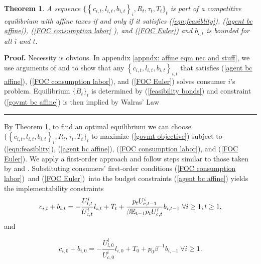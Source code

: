 \documentclass[thmsb,11pt]{article}
\newtheorem{theorem}{Theorem}
\newenvironment{proof}[1][Proof]{\noindent \textbf{#1.} }{\  \rule{0.5em}{0.5em}}
\begin{document}
\begin{theorem}
\label{prop: affine eqm nec and suff}A sequence $\{ \left \{
c_{i,t},l_{i,t},b_{i,t}\right \} _{i},R_{t},\tau _{t},T_{t}\}_t$ is part of
a competitive equilibrium with affine taxes if and only if it satisfies (\ref{eqn:feasiblity}), (\ref{agent bc affine}), (\ref{FOC consumption labor}%
), and (\ref{FOC Euler}) and $b_{i,t}$ is bounded for all $i$ and $t.$
\end{theorem}
\begin{proof}
Necessity is obvious. In  appendix   \ref{appndx: affine eqm nec and stuff}, we use arguments of \cite{Magill1994} and \cite{Constantinides1996} to show that any $\left \{
c_{i,t},l_{i,t},b_{i,t}\right \} _{i,t}$ that satisfies (\ref{agent bc
affine}), (\ref{FOC consumption labor}), and (\ref{FOC Euler}) solves consumer $i$'s  problem. Equilibrium $\{B_{t}\}_t$ is determined by
(\ref{feasibility bonds}) and constraint (\ref{govmt bc affine}) is then
implied by Walras' Law
\end{proof}

By Theorem  \ref{prop: affine eqm nec and suff}, to find an optimal equilibrium
we can choose $\{ \left \{ c_{i,t},l_{i,t},b_{i,t}\right \} _{i},R_{t},\tau
_{t},T_{t}\}_{t}$ to maximize (\ref{govmt objective}) subject to (\ref{eqn:feasiblity}), (\ref{agent bc affine}), (\ref{FOC consumption labor}), and (\ref{FOC Euler}).
We  apply a first-order approach and follow steps similar to those taken by \cite{LucasJr.1983} and \citet{Aiyagari2002}.
 Substituting consumers' first-order
conditions (\ref{FOC consumption labor})\ and (\ref{FOC Euler})\ into the
budget constraints (\ref{agent bc affine}) yields the implementability constraints %
\begin{equation}
c_{i,t}+b_{i,t}=-\frac{U_{l,t}^{i}}{U_{c,t}^{i}}l_{i,t}+T_{t}+\frac{%
p_tU_{c,t-1}^{i}}{\beta \mathbb{E}_{t-1}p_tU_{c,t}^{i}}b_{i,t-1}\ \forall i \geq 1 ,t \geq 1,  \label{affine implementability a}
\end{equation}
and %

\begin{equation}
\label{affine implementability a t=0}
c_{i,0}+b_{i,0}=-\frac{U_{l,0}^{i}}{U_{c,0}^{i}}l_{i,0}+T_{0}+
p_0 \beta^{-1}b_{i,-1}\ \forall i \geq 1.
\end{equation}
\end{document}
